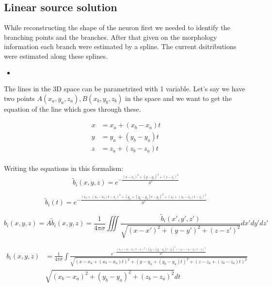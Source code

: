 \documentclass[12pt,a4paper]{article}
\begin{document}
\subsection{ Linear source solution }
While reconstructing the shape of the neuron first we needed to identify the branching points and the branches. After that given on the morphology information each branch were estimated by a spline. The current dsitributions were estimated along these splines. 
\begin{itemize}
\item 
\end{itemize}
The lines in the 3D space can be parametrized with 1 variable. Let's say we have two 
points $A (x_a,y_a,z_a), B (x_b,y_b,z_b)$ in the space and we want to get the equation of the line which goes through these. 

\begin{align}
x &= x_a + (x_b - x_a) t \\
y &= y_a+(y_b-y_a)t \\
z &= z_a+(z_b-z_a)t \\
\end{align}


Writing the equations in this formalism:
\begin{equation}
\tilde{b}_i (x,y,z) = e^{- \frac{(x-x_i)^2+(y-y_i)^2+(z-z_i)^2}{R^2}}
\end{equation}

\begin{equation}
\tilde{b}_i (t) = e^{- \frac{(x_a + (x_b - x_a) t -x_i)^2+(y_a+(y_b-y_a)t-y_i)^2+( z_a+(z_b-z_a)t-z_i)^2}{R^2}}
\end{equation}



\begin{equation}
b_i (x,y,z)= A \tilde{b}_i (x,y,z)= \frac{1}{4 \pi \sigma} \iiint 
\frac{ \tilde{b}_i (x',y',z')}{\sqrt{(x-x')^2+(y-y')^2+(z-z')^2}} dx' dy' dz'
\end{equation}



\begin{align}
b_i (x,y,z) &= 
\frac{1}{4 \pi \sigma} \int 
\frac{ e^{- \frac{(x_a + (x_b - x_a) t -x_i)^2+(y_a+(y_b-y_a)t-y_i)^2+( z_a+(z_b-z_a)t-z_i)^2}{R^2}}}{\sqrt{(x-x_a + (x_b - x_a) t)^2+(y- y_a+(y_b-y_a)t )^2+(z-z_a+(z_b-z_a)t)^2}} \\
&\sqrt{(x_b-x_a)^2 +(y_b-y_a)^2+(z_b-z_a)^2} dt
\end{align}
\end{document}
